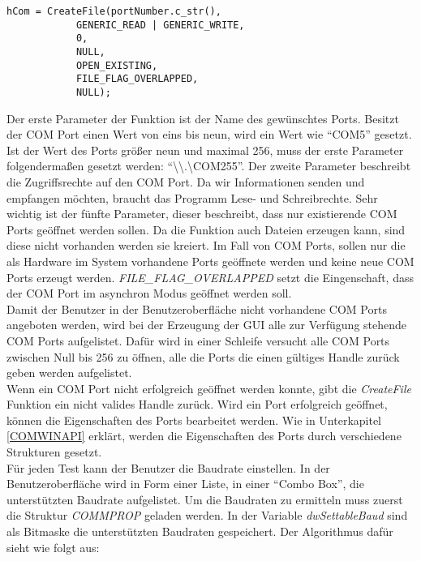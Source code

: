 \begin{lstlisting}	 
hCom = CreateFile(portNumber.c_str(),  
            GENERIC_READ | GENERIC_WRITE,
            0, 
            NULL,
            OPEN_EXISTING, 
            FILE_FLAG_OVERLAPPED,
            NULL); 

\end{lstlisting}

Der erste Parameter der Funktion ist der Name des gewünschtes Ports. Besitzt der COM Port einen Wert von eins bis neun, wird ein Wert wie "`COM5"' gesetzt. Ist der Wert des Ports größer neun und maximal 256, muss der erste Parameter folgendermaßen gesetzt werden: "`\textbackslash\textbackslash.\textbackslash COM255"'. Der zweite Parameter beschreibt die Zugriffsrechte auf den COM Port. Da wir Informationen senden und empfangen möchten, braucht das Programm Lese- und Schreibrechte. Sehr wichtig ist der fünfte Parameter, dieser beschreibt, dass nur existierende COM Ports geöffnet werden sollen. Da die Funktion auch Dateien erzeugen kann, sind diese nicht vorhanden werden sie kreiert. Im Fall von COM Ports, sollen nur die als Hardware im System vorhandene Ports geöffnete werden und keine neue COM Ports erzeugt werden. \textit{FILE\_FLAG\_OVERLAPPED} setzt die Eingenschaft, dass der COM Port im asynchron Modus geöffnet werden soll.\\

Damit der Benutzer in der Benutzeroberfläche nicht vorhandene COM Ports angeboten werden, wird bei der Erzeugung der GUI alle zur Verfügung stehende COM Ports aufgelistet. Dafür wird in einer Schleife versucht alle COM Ports zwischen Null bis 256 zu öffnen, alle die Ports die einen gültiges Handle zurück geben werden aufgelistet.\\


Wenn ein COM Port nicht erfolgreich geöffnet werden konnte, gibt die \textit{CreateFile} Funktion ein nicht valides Handle zurück. Wird ein Port erfolgreich geöffnet, können die Eigenschaften des Ports bearbeitet werden. Wie in Unterkapitel \ref{COMWINAPI} erklärt, werden die Eigenschaften des Ports durch verschiedene Strukturen gesetzt.\\

Für jeden Test kann der Benutzer die Baudrate einstellen. In der Benutzeroberfläche wird in Form einer Liste, in einer "`Combo Box"', die unterstützten Baudrate aufgelistet. Um die Baudraten zu ermitteln muss zuerst die Struktur \textit{COMMPROP} geladen werden. In der Variable \textit{dwSettableBaud} sind als Bitmaske die unterstützten Baudraten gespeichert. Der Algorithmus dafür sieht wie folgt aus:

